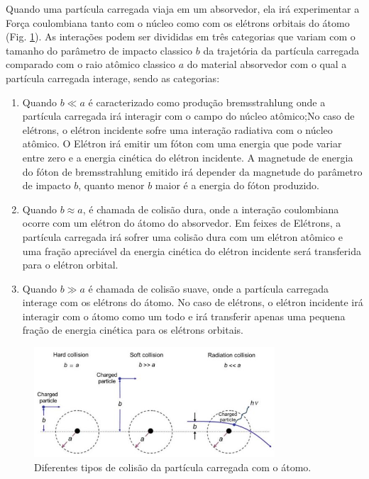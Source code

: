\documentclass[11pt,a4paper]{article}
\begin{document}
            Quando uma partícula carregada viaja em um absorvedor, ela irá experimentar a Força coulombiana tanto com o núcleo como com os elétrons orbitais do átomo (Fig. \ref{fig:colisoesComOAtomo}). As interações podem ser divididas em três categorias que variam com o tamanho do parâmetro de impacto classico $b$ da trajetória da partícula carregada comparado com o raio atômico classico $a$ do material absorvedor com o qual a partícula carregada interage, sendo as categorias:

                \begin{enumerate}
                    \item Quando $b \ll a$ é caracterizado como produção bremsstrahlung onde a partícula carregada irá interagir com o campo do núcleo atômico;No caso de elétrons, o elétron incidente sofre uma interação radiativa com o núcleo atômico. O Elétron irá emitir um fóton com uma energia que pode variar entre zero e a energia cinética do elétron incidente. A magnetude de energia do fóton de bremsstrahlung emitido irá depender da magnetude do parâmetro de impacto $b$, quanto menor $b$ maior é a energia do fóton produzido. 
                    \item Quando $b \approx a$, é chamada de colisão dura, onde a interação coulombiana ocorre com um elétron do átomo do absorvedor. Em feixes de Elétrons,  a partícula carregada irá sofrer uma colisão dura com um elétron atômico e uma fração apreciável da energia cinética do elétron incidente será transferida para o elétron orbital. 
                    \item Quando $ b \gg a $ é chamada de colisão suave, onde a partícula carregada interage com os elétrons do átomo. No caso de elétrons, o elétron incidente irá interagir com o átomo como um todo e irá transferir apenas uma pequena fração de energia cinética para os elétrons orbitais. 
                \end{enumerate}


                \begin{figure}[h]
                    \centering
                    \includegraphics[width=0.8\textwidth]{Imagens/tiposDeColisoes.JPG}
                    \caption{Diferentes tipos de colisão da partícula carregada com o átomo.}
                    \label{fig:colisoesComOAtomo}                
                \end{figure}
\end{document}
